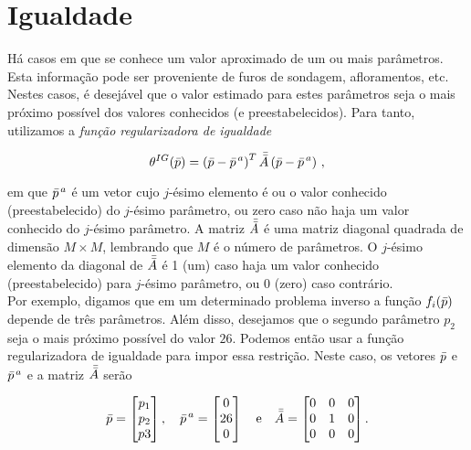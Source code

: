 \section{Igualdade}

Há casos em que se conhece um valor aproximado de um ou mais parâmetros.
Esta informação pode ser proveniente de furos de sondagem, afloramentos, etc.
Nestes casos, é desejável que o valor estimado para estes parâmetros seja o mais
próximo possível dos valores conhecidos (e preestabelecidos).
Para tanto, utilizamos a {\it função regularizadora de igualdade}

\begin{equation}
\theta^{IG}(\bar{p}) =
    \left(\bar{p} - \bar{p}^{\thinspace a}\right)^T \bar{\bar{A}}
        \left(\bar{p} - \bar{p}^{\thinspace a} \right)
    \thinspace ,
\label{eq:igualdade}
\end{equation}

\noindent em que $\bar{p}^{\thinspace a}$ é um vetor cujo $j$-ésimo elemento é
ou o valor conhecido (preestabelecido) do $j$-ésimo parâmetro, ou zero caso não
haja um valor conhecido do $j$-ésimo parâmetro. A matriz $\bar{\bar{A}}$ é uma matriz
diagonal quadrada de dimensão $M \times M$, lembrando que $M$ é o número de
parâmetros.
O $j$-ésimo elemento da diagonal de $\bar{\bar{A}}$ é 1 (um) caso
haja um valor conhecido (preestabelecido) para $j$-ésimo parâmetro, ou 0 (zero)
caso contrário.
\\
\indent Por exemplo, digamos que em um determinado problema inverso a função
$f_i(\bar{p})$ depende de três parâmetros. Além disso, desejamos que o segundo
parâmetro $p_2$ seja o mais próximo possível do valor $26$.
Podemos então usar a função regularizadora de igualdade para impor essa restrição.
Neste caso, os vetores $\bar{p}$ e $\bar{p}^{\thinspace a}$ e a matriz
$\bar{\bar{A}}$ serão

\[
\bar{p} =
    \begin{bmatrix}
    p_1 \\ p_2 \\ p3
    \end{bmatrix} , \quad
\bar{p}^{\thinspace a} =
    \begin{bmatrix}
    0 \\ 26 \\ 0
    \end{bmatrix} \quad \text{e} \quad
\bar{\bar{A}} = 
    \begin{bmatrix}
    0 & 0 & 0 \\
    0 & 1 & 0 \\
    0 & 0 & 0
    \end{bmatrix} .
\]


